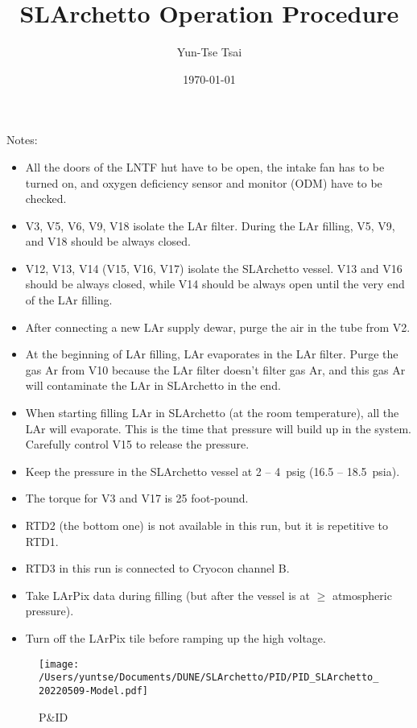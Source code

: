 \documentclass[letterpaper,11pt]{article}
\begin{document}
\title{\textbf{SLArchetto Operation Procedure}}
\author{Yun-Tse Tsai}
\date{\today}

\maketitle


Notes:
\begin{itemize}
\setlength\itemsep{-0.2em}
\item All the doors of the LNTF hut have to be open, the intake fan has to be turned on, and oxygen deficiency sensor and monitor (ODM) have to be checked.
\item V3, V5, V6, V9, V18 isolate the LAr filter.  During the LAr filling, V5, V9, and V18 should be always closed.
\item V12, V13, V14 (V15, V16, V17) isolate the SLArchetto vessel.  V13 and V16 should be always closed, while V14 should be always open until the very end of the LAr filling.
\item After connecting a new LAr supply dewar, purge the air in the tube from V2.
\item At the beginning of LAr filling, LAr evaporates in the LAr filter.  Purge the gas Ar from V10 because the LAr filter doesn't filter gas Ar, and this gas Ar will contaminate the LAr in SLArchetto in the end.
\item When starting filling LAr in SLArchetto (at the room temperature), all the LAr will evaporate.  This is the time that pressure will build up in the system.  Carefully control V15 to release the pressure.
\item Keep the pressure in the SLArchetto vessel at 2 -- 4~psig (16.5 -- 18.5~psia).
\item The torque for V3 and V17 is 25 foot-pound.
\item RTD2 (the bottom one) is not available in this run, but it is repetitive to RTD1.
\item RTD3 in this run is connected to Cryocon channel B.
\item Take LArPix data during filling (but after the vessel is at $\ge$ atmospheric pressure).
\item Turn off the LArPix tile before ramping up the high voltage.
\end{itemize}

\clearpage
\begin{figure}[htb]
\begin{center}
\texttt{[image: /Users/yuntse/Documents/DUNE/SLArchetto/PID/PID\_SLArchetto\_20220509-Model.pdf]}
\caption{P\&ID}
\end{center}
\end{figure}
\end{document}
